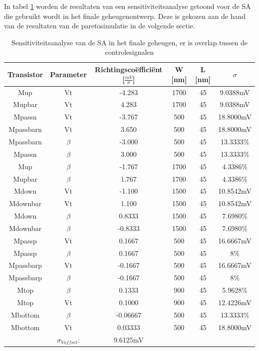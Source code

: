 In tabel \ref{tab:ourSA-sensanalysis-overlap} worden de resultaten van een sensitiviteitsanalyse getoond voor de SA die gebruikt wordt in het finale geheugenontwerp. Deze is gekozen aan de hand van de resultaten van de paretosimulatie in de volgende sectie.


\begin{table}
\begin{tabular}{cccccc}
\hline 
Transistor & Parameter & Richtingscoëfficiënt [$\frac{mV}{\sigma}$] & W [nm] & L [nm] & $\sigma$ \\ 
\hline 
Mup & Vt & -4.283 & 1700 & 45 & 9.0388mV \\ 
Mupbar & Vt & 4.283 & 1700 & 45 & 9.0388mV \\ 
Mpassn & Vt & -3.767 & 500 & 45 & 18.8000mV \\
Mpassbarn & Vt & 3.650 & 500 & 45 & 18.8000mV \\
Mpassbarn & $\beta$ & -3.000 & 500 & 45 & 13.3333\% \\ 
Mpassn & $\beta$ & 3.000 & 500 & 45 & 13.3333\% \\ 
Mup & $\beta$ & -1.767 & 1700 & 45 & 4.3386\% \\ 
Mupbar & $\beta$ & 1.767 & 1700 & 45 & 4.3386\% \\ 
Mdown & Vt & -1.100 & 1500 & 45 & 10.8542mV \\ 
Mdownbar & Vt & 1.100 & 1500 & 45 & 10.8542mV \\
Mdown & $\beta$ & 0.8333 & 1500 & 45 & 7.6980\% \\
Mdownbar & $\beta$ & -0.8333 & 1500 & 45 & 7.6980\% \\  
Mpassp & Vt & 0.1667 & 500 & 45 & 16.6667mV \\ 
Mpassp & $\beta$ & 0.1667 & 500 & 45 & 8\% \\ 
Mpassbarp & Vt & -0.1667 & 500 & 45 & 16.6667mV \\
Mpassbarp & $\beta$ & -0.1667 & 500 & 45 & 8\% \\ 
Mtop & $\beta$ & 0.1333 & 900 & 45 & 5.9628\% \\ 
Mtop & Vt & 0.1000 & 900 & 45 & 12.4226mV \\ 
Mbottom & $\beta$ & -0.06667 & 500 & 45 & 13.3333\% \\ 
Mbottom & Vt & 0.03333 & 500 & 45 & 18.8000mV \\ 
\hline 
\hline & $\sigma_{Voffset}$: & 9.6125mV & & & \\
\hline
\end{tabular} 
\caption{Sensitiviteitsanalyse van de SA in het finale geheugen, er is overlap tussen de controlesignalen}
\label{tab:ourSA-sensanalysis-overlap}
\end{table}

